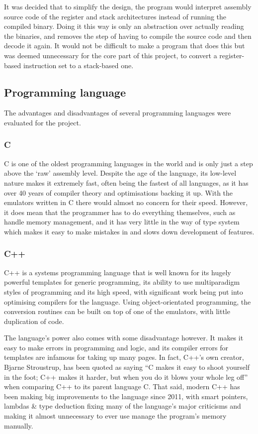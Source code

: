 It was decided that to simplify the design, the program would interpret assembly
source code of the register and stack architectures instead of running the
compiled binary. Doing it this way is only an abstraction over actually reading
the binaries, and removes the step of having to compile the source code and then
decode it again. It would not be difficult to make a program that does this but
was deemed unnecessary for the core part of this project, to convert a
register-based instruction set to a stack-based one.

\subsection{Programming language}
The advantages and disadvantages of several programming languages were evaluated
for the project.

\subsubsection{C}
C is one of the oldest programming languages in the world and is only just a
step above the `raw' assembly level. Despite the age of the language, its
low-level nature makes it extremely fast, often being the fastest of all
languages, as it has over 40 years of compiler theory and optimisations backing
it up. With the emulators written in C there would almost no concern for their
speed.  However, it does mean that the programmer has to do everything
themselves, such as handle memory management, and it has very little in the way
of type system which makes it easy to make mistakes in and slows down
development of features.

\subsubsection{C++}
C++ is a systems programming language that is well known for its hugely
powerful templates for generic programming, its ability to use multiparadigm
styles of programming and its high speed, with significant work being put into
optimising compilers for the language. Using object-orientated programming, the
conversion routines can be built on top of one of the emulators, with little
duplication of code.

The language's power also comes with some disadvantage however. It makes it easy
to make errors in programming and logic, and its compiler errors for templates
are infamous for taking up many pages. In fact, C++'s own creator, Bjarne
Stroustrup, has been quoted as saying ``C makes it easy to shoot yourself in the
foot; C++ makes it harder, but when you do it blows your whole leg off'' when
comparing C++ to its parent language C. That said, modern C++ has been making
big improvements to the language since 2011, with smart pointers, lambdas \&
type deduction fixing many of the language's major criticisms and making it
almost unnecessary to ever use manage the program's memory manually.

